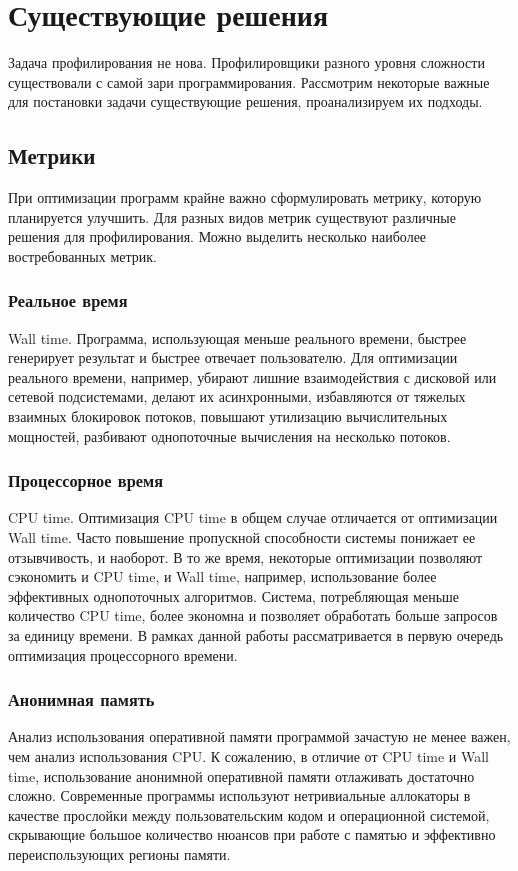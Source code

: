 \section{Существующие решения}
Задача профилирования не нова.
Профилировщики разного уровня сложности существовали с самой зари программирования.
Рассмотрим некоторые важные для постановки задачи существующие решения, проанализируем их подходы.

\subsection{Метрики}
При оптимизации программ крайне важно сформулировать метрику, которую планируется улучшить.
Для разных видов метрик существуют различные решения для профилирования. Можно выделить несколько наиболее востребованных метрик.

\subsubsection{Реальное время}
Wall time. Программа, использующая меньше реального времени, быстрее генерирует результат и быстрее отвечает пользователю. Для оптимизации реального времени, например, убирают лишние взаимодействия с дисковой или сетевой подсистемами, делают их асинхронными, избавляются от тяжелых взаимных блокировок потоков, повышают утилизацию вычислительных мощностей, разбивают однопоточные вычисления на несколько потоков.

\subsubsection{Процессорное время}
CPU time. Оптимизация CPU time в общем случае отличается от оптимизации Wall time.
Часто повышение пропускной способности системы понижает ее отзывчивость, и наоборот.
В то же время, некоторые оптимизации позволяют сэкономить и CPU time, и Wall time, например, использование более эффективных однопоточных алгоритмов.
Система, потребляющая меньше количество CPU time, более экономна и позволяет обработать больше запросов за единицу времени.
В рамках данной работы рассматривается в первую очередь оптимизация процессорного времени.

\subsubsection{Анонимная память}
Анализ использования оперативной памяти программой зачастую не менее важен, чем анализ использования CPU.
К сожалению, в отличие от CPU time и Wall time, использование анонимной оперативной памяти
отлаживать достаточно сложно. Современные программы используют нетривиальные аллокаторы
в качестве прослойки между пользовательским кодом и операционной системой, скрывающие большое
количество нюансов при работе с памятью и эффективно переиспользующих регионы памяти.

